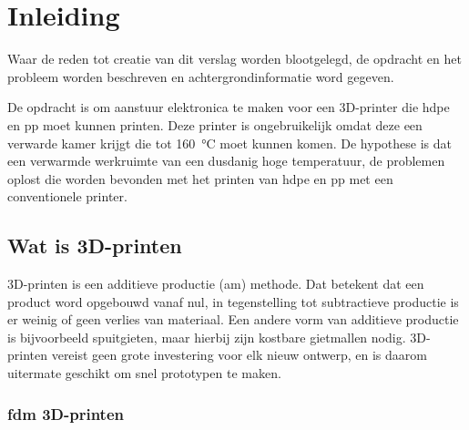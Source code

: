 \chapter{Inleiding}
\label{inleiding}

\begin{center}
    \begin{minipage}{0.5\textwidth}
        \begin{small}
            Waar de reden tot creatie van dit verslag worden blootgelegd, de
            opdracht en het probleem worden beschreven en achtergrondinformatie
            word gegeven.
        \end{small}
    \end{minipage}
    \vspace{0.5cm}
\end{center}

\noindent De opdracht is om aanstuur elektronica te maken voor een 3D-printer
die \ac{hdpe} en \ac{pp} moet kunnen printen. Deze printer is ongebruikelijk
omdat deze een verwarde kamer krijgt die tot \SI{160}{\celsius} moet kunnen
komen. De hypothese is dat een verwarmde werkruimte van een dusdanig hoge
temperatuur, de problemen oplost die worden bevonden met het printen van
\ac{hdpe} en \ac{pp} met een conventionele printer.

\section{Wat is 3D-printen}

3D-printen is een additieve productie (\ac{am}) methode. Dat betekent dat een
product word opgebouwd vanaf nul, in tegenstelling tot subtractieve productie
is er weinig of geen verlies van materiaal.  Een andere vorm van additieve
productie is bijvoorbeeld spuitgieten, maar hierbij zijn kostbare gietmallen
nodig. 3D-printen vereist geen grote investering voor elk nieuw ontwerp, en is
daarom uitermate geschikt om snel prototypen te maken. \cite{ATTARAN2017677}

\subsection{\ac{fdm} 3D-printen}

